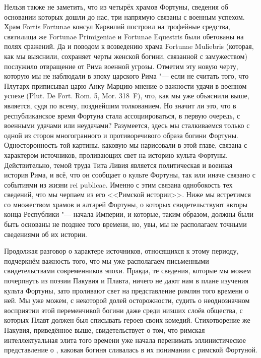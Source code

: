 
Нельзя также не заметить, что из четырёх храмов Фортуны, сведения об основании которых дошли до нас, три напрямую связаны с военным успехом. Храм Fortis Fortunae консул Карвилий построил на трофейные средства, святилища же Fortunae Primigeniae и Fortunae Equestris были обетованы на полях сражений. Да и поводом к возведению храма Fortunae Muliebris (которая, как мы выяснили, сохраняет черты женской богини, связанной с замужеством) послужило отвращение от Рима военной угрозы. Отметим эту новую черту, которую мы не наблюдали в эпоху царского Рима "--- если не считать того, что Плутарх приписывал царю Анку Марцию мнение о важности удачи в военном успехе (Plut. De Fort. Rom. 5, Mor. 318~F), что, как мы уже объяснили выше, является, судя по всему, позднейшим толкованием. Но значит ли это, что в республиканское время Фортуна стала ассоциироваться, в первую очередь, с военными удачами или неудачами? Разумеется, здесь мы сталкиваемся только с одной из сторон многогранного и противоречивого образа богини Фортуны. Односторонность той картины, каковую мы нарисовали в этой главе, связана с характером источников, проливающих свет на историю культа Фортуны. Действительно, темой труда Тита Ливия является политическая и военная история Рима, и всё, что он сообщает о культе Фортуны, так или иначе связано с событиями из жизни rei publicae. Именно с этим связана однобокость тех сведений, что мы черпаем из его <<Римской истории>>. Ниже мы встретимся со множеством храмов и алтарей Фортуны, о которых свидетельствуют авторы конца Республики "--- начала Империи, и которые, таким образом, должны были быть основаны не позднее того времени, но, увы, мы не располагаем точными сведениями об их истории.

Продолжая разговор о характере источников, относящихся к этому периоду, подчеркнём важность того, что мы уже располагаем письменными свидетельствами современников эпохи. Правда, те сведения, которые мы можем почерпнуть из поэзии Пакувия и Плавта, ничего не дают нам в плане изучения культа Фортуны, зато проливают свет на представление римлян того времени о ней. Мы уже можем, с некоторой долей осторожности, судить о неоднозначном восприятии этой переменчивой богини даже среди низших слоёв общества, с которых Плавт должен был списывать героев своих комедий. Стихотворение же Пакувия, приведённое выше, свидетельствует о том, что римская интеллектуальная элита того времени уже начала перенимать эллинистическое представление о , каковая богиня сливалась в их понимании с римской Фортуной.



